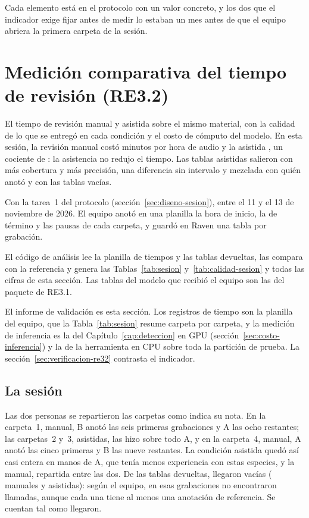 Cada elemento está en el protocolo con un valor concreto, y los dos que el
indicador exige fijar antes de medir lo estaban un mes antes de que el equipo
abriera la primera carpeta de la sesión.

\section{Medición comparativa del tiempo de revisión (RE3.2)}
\label{sec:re32}

 El tiempo de revisión manual y asistida sobre el mismo
material, con la calidad de lo que se entregó en cada condición y el costo de
cómputo del modelo. En esta sesión, la revisión manual costó \uMinManual{}
minutos por hora de audio y la asistida \uMinAssisted{}, un cociente de
\uTimeRatio{}: la asistencia no redujo el tiempo. Las tablas asistidas
salieron con más cobertura y más precisión, una diferencia sin intervalo y
mezclada con quién anotó y con las tablas vacías.

 Con la tarea~1 del protocolo
(sección~\ref{sec:diseno-sesion}), entre el 11 y el 13 de noviembre de 2026. El
equipo anotó en una planilla la hora de inicio, la de término y las pausas de cada
carpeta, y guardó en Raven una tabla por grabación.

 El código de análisis lee la planilla de tiempos y las tablas devueltas, las compara con la referencia y
genera las Tablas~\ref{tab:sesion} y~\ref{tab:calidad-sesion} y todas las cifras
de esta sección. Las tablas del modelo que recibió el equipo son las del paquete
de RE3.1.

 El informe de validación es esta sección. Los
registros de tiempo son la planilla del equipo, que la Tabla~\ref{tab:sesion}
resume carpeta por carpeta, y la medición de inferencia es la del
Capítulo~\ref{cap:deteccion} en GPU (sección~\ref{sec:costo-inferencia}) y la de
la herramienta en CPU sobre toda la partición de prueba. La
sección~\ref{sec:verificacion-re32} contrasta el indicador.

\subsection{La sesión}
\label{sec:sesion}

Las dos personas se repartieron las carpetas como indica su nota. En la
carpeta~1, manual, B anotó las seis primeras grabaciones y A las ocho restantes;
las carpetas~2 y~3, asistidas, las hizo sobre todo A, y en la carpeta~4, manual, A
anotó las cinco primeras y B las nueve restantes. La condición asistida quedó así
casi entera en manos de A, que tenía menos experiencia con estas especies, y la
manual, repartida entre las dos. De las \uSessionRecordings{} tablas devueltas,
\uEmptyTables{} llegaron vacías (\uEmptyManual{} manuales y \uEmptyAssisted{}
asistidas): según el equipo, en esas grabaciones no encontraron llamadas, aunque
cada una tiene al menos una anotación de referencia. Se cuentan tal como llegaron.

